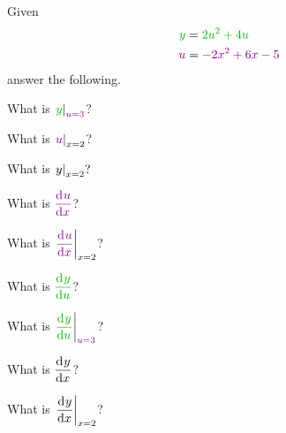 

\begin{multicols}{2}
 Given
 \begin{equation*}
  \begin{split}
    \OuterStyle{y} &= \OuterStyle{2 u^2 + 4 u}
    \\
    \InnerStyle{u} &= \InnerStyle{-2 x^2 + 6x - 5}
  \end{split}
 \end{equation*}
 answer the following.
 \bigskip

 \begin{ProblemSet}[pencil space=1.25in]

  \begin{Problem}
   What is $\displaystyle{\Where{\OuterStyle{y}}{\InnerStyle{u=3}}}$?
  \end{Problem}

  \begin{Problem}
   What is $\displaystyle{\Where{\InnerStyle{u}}{x=2}}$?
  \end{Problem}

  \begin{Problem}
   What is $\displaystyle\left.y\right|_{x=2}?$
  \end{Problem}

  \begin{Problem}
   What is $\displaystyle{\InnerStyle{\Deriv{u}{x}}}$?
  \end{Problem}

  \begin{Problem}
   What is $\displaystyle{\Where{\InnerStyle{\Deriv{u}{x}}}{x=2}}$?
  \end{Problem}

  \begin{Problem}
   What is $\displaystyle{\OuterStyle{\Deriv{y}{u}}}$?
  \end{Problem}

  \begin{Problem}
   What is $\displaystyle{\Where{\OuterStyle{\Deriv{y}{u}}}{\InnerStyle{u=3}}}$?
  \end{Problem}

  \begin{Problem}
   What is $\displaystyle\frac{\mathrm{d}^{{}}y}{\mathrm{d} x^{{}}}$?
  \end{Problem}

  \begin{Problem}
   What is $\displaystyle\left.\frac{\mathrm{d}^{{}}y}{\mathrm{d} x^{{}}}\right|_{x=2}$?
  \end{Problem}

 \end{ProblemSet}
\end{multicols}

